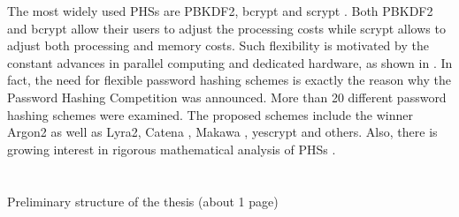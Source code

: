 \documentclass[a4paper,10pt,english]{INSOexpose}
\begin{document}
The most widely used PHSs are PBKDF2, bcrypt and scrypt \cite{cryptoeprint:2015:265}\cite{Andrade:2016:Lyra2}. Both PBKDF2 \cite{moriarty2017pkcs} and bcrypt \cite{provos1999future} allow their users to adjust the processing costs while scrypt \cite{percival:2009:scrypt} allows to adjust both processing and memory costs. Such flexibility is motivated by the constant advances in parallel computing and dedicated hardware, as shown in \cite{orman2013twelve}. In fact, the need for flexible password hashing schemes is exactly the reason why the Password Hashing Competition was announced. More than 20 different password hashing schemes were examined. The proposed schemes include the winner Argon2 \cite{biryukov2016argon2} as well as Lyra2, Catena \cite{forler2013catena}, Makawa \cite{pornin2015makwa}, yescrypt \cite{peslyak2015yescrypt} and others. Also, there is growing interest in rigorous mathematical analysis of PHSs \cite{cryptoeprint:2015:430}.

\section{}

Preliminary structure of the thesis (about 1 page)
\end{document}
